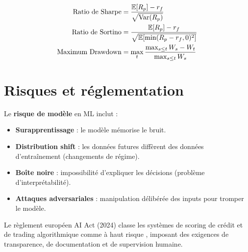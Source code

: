 \begin{formules}[title=\textbf{M\'etriques de performance des strat\'egies ML}]
\begin{align*}
    \text{Ratio de Sharpe} &= \frac{\mathbb{E}[R_p] - r_f}{\sqrt{\mathrm{Var}(R_p)}} \\
    \text{Ratio de Sortino} &= \frac{\mathbb{E}[R_p] - r_f}{\sqrt{\mathbb{E}[\min(R_p - r_f, 0)^2]}} \\
    \text{Maximum Drawdown} &= \max_{t} \frac{\max_{s \leq t} W_s - W_t}{\max_{s \leq t} W_s}
\end{align*}
\end{formules}

\section{Risques et r\'eglementation}

\begin{definition}
Le \textbf{risque de mod\`ele} en ML inclut :
\begin{itemize}
    \item \textbf{Surapprentissage} : le mod\`ele m\'emorise le bruit.
    \item \textbf{Distribution shift} : les donn\'ees futures diff\`erent des
    donn\'ees d'entra\^inement (changements de r\'egime).
    \item \textbf{Bo\^ite noire} : impossibilit\'e d'expliquer les d\'ecisions
    (probl\`eme d'interpr\'etabilit\'e).
    \item \textbf{Attaques adversariales} : manipulation d\'elib\'er\'ee des
    inputs pour tromper le mod\`ele.
\end{itemize}
\end{definition}

\begin{remarque}
Le r\`eglement europ\'een AI Act (2024) classe les syst\`emes de scoring de
cr\'edit et de trading algorithmique comme \`a \og haut risque \fg, imposant
des exigences de transparence, de documentation et de supervision humaine.
\end{remarque}

